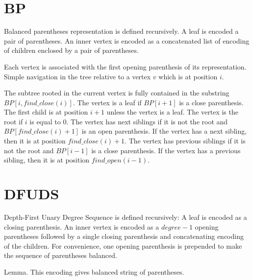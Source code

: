 \section{BP}

Balanced parentheses representation is defined recursively.
A leaf is encoded a pair of parentheses.
An inner vertex is encoded as a concatenated list of encoding of children enclosed by a pair of parentheses.


Each vertex is associated with the first opening parenthesis of its representation.
Simple navigation in the tree relative to a vertex $v$ which is at position $i$.

The subtree rooted in the current vertex is fully contained in the substring $BP[i, find\_close(i)]$.
The vertex is a leaf if $BP[i+1]$ is a close parenthesis.
The first child is at position $i+1$ unless the vertex is a leaf.
The vertex is the root if $i$ is equal to $0$.
The vertex has next siblings if it is not the root and $BP[find\_close(i) + 1]$ is an open parenthesis.
If the vertex has a next sibling, then it is at position $find\_close(i) + 1$.
The vertex has previous siblings if it is not the root and $BP[i-1]$ is a close parenthesis.
If the vertex has a previous sibling, then it is at position $find\_open(i-1)$.

\section{DFUDS}

Depth-First Unary Degree Sequence is defined recursively:
A leaf is encoded as a closing parenthesis.
An inner vertex is encoded as a $degree-1$ opening parentheses followed by a single closing parenthesis and concatenating encoding of the children.
For convenience, one opening parenthesis is prepended to make the sequence of parentheses balanced.

Lemma.
This encoding gives balanced string of parentheses.
